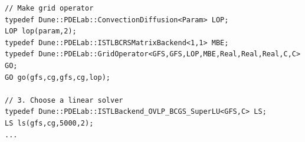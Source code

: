 {\begin{frame}[fragile]
\begin{lstlisting}[basicstyle=\tiny]
// Make grid operator
typedef Dune::PDELab::ConvectionDiffusion<Param> LOP; 
LOP lop(param,2);
typedef Dune::PDELab::ISTLBCRSMatrixBackend<1,1> MBE;
typedef Dune::PDELab::GridOperator<GFS,GFS,LOP,MBE,Real,Real,Real,C,C> GO;
GO go(gfs,cg,gfs,cg,lop);

// 3. Choose a linear solver 
typedef Dune::PDELab::ISTLBackend_OVLP_BCGS_SuperLU<GFS,C> LS;
LS ls(gfs,cg,5000,2);
...
\end{lstlisting}
  
\end{frame}
}

\cleardoublepage

